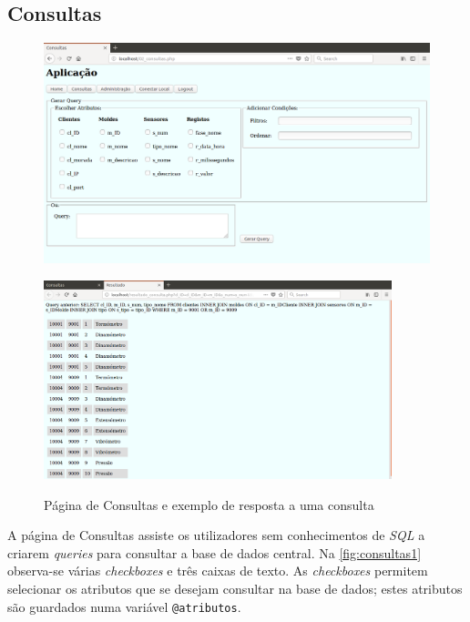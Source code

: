 \documentclass[11pt,twoside,a4paper]{report}
\begin{document}
\subsection{Consultas}
\begin{figure}[H]
	\centering
	\begin{minipage}{1.\textwidth}
		\begin{center}
			\includegraphics[width=.9\textwidth]{consultas01} %
			\label{fig:consultas1}
		\end{center}
	\end{minipage}
	\begin{minipage}{1.\textwidth}
		\begin{center}
			\includegraphics[width=0.9\textwidth]{consultas02} %
			\label{fig:consultas2}
		\end{center}
	\end{minipage}
	\caption{Página de Consultas e exemplo de resposta a uma consulta}
	\label{fig:consultas0}
\end{figure}
A página de Consultas assiste os utilizadores sem conhecimentos de \textit{SQL} a criarem \textit{queries} para consultar a base de dados central. Na \autoref{fig:consultas1} observa-se várias \textit{checkboxes} e três caixas de texto. As \textit{checkboxes} permitem selecionar os atributos que se desejam consultar na base de dados; estes atributos são guardados numa variável \texttt{@atributos}.
\end{document}

